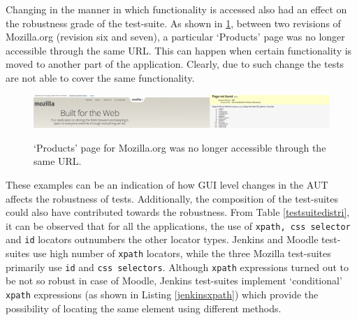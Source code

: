 



Changing in the manner in which functionality is accessed  also had an effect on the robustness grade of the test-suite. As shown in \ref{fig:bedrockchanges}, between two revisions of Mozilla.org (revision six and seven), a particular `Products' page was no longer accessible through the same URL. This can happen when certain functionality is moved to another part of the application. Clearly, due to such change the tests are not able to cover the same functionality. 

\begin{figure}[ht!] 
\centering     %
{\label{rob:bedrock1}\includegraphics[width=\linewidth]{./Figures/bedrock1}}
\captionsetup{justification=justified,
singlelinecheck=false}
\caption{`Products' page for Mozilla.org was no longer accessible through the same URL.}
\label{fig:bedrockchanges}
\end{figure} 

These examples can be an indication of how GUI level changes in the AUT affects the robustness of tests. Additionally, the composition of the test-suites could also have contributed towards the robustness. From Table \ref{testsuitedistri}, it can be observed that for all the applications, the use of \texttt{xpath, css selector} and \texttt{id} locators outnumbers the other locator types. Jenkins and Moodle test-suites use high number of \texttt{xpath} locators, while the three Mozilla test-suites primarily use \texttt{id} and \texttt{css selectors}. Although \texttt{xpath} expressions turned out to be not so robust in case of Moodle, Jenkins test-suites implement `conditional' \texttt{xpath} expressions (as shown in Listing \ref{jenkinsxpath}) which provide the possibility of locating the same element using different methods. 

